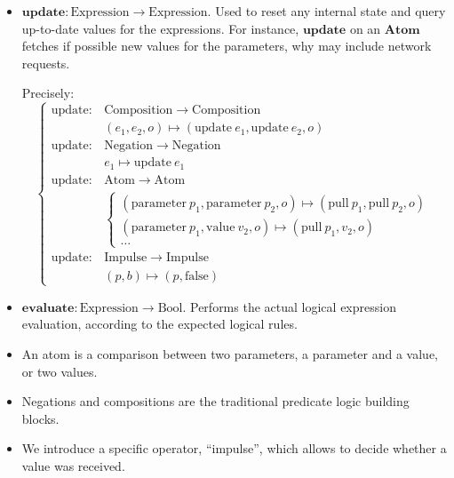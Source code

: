 \documentclass[applsci,article,submit,moreauthors,pdftex,10pt,a4paper]{mdpi}
\begin{document}
\begin{itemize}
    \item $\mathbf{update}: \mathrm{Expression} \rightarrow \mathrm{Expression}$. Used to reset any internal state and query up-to-date values for the expressions. For instance, $\mathbf{update}$ on an $\mathbf{Atom}$ fetches if possible new values for the parameters, why may include network requests.
    
    Precisely:
    \[
    \begin{cases}
    \mathrm{update} : & \mathrm{Composition} \rightarrow \mathrm{Composition} \\ 
    & (e_1, e_2, o) \mapsto (\mathrm{update}~e_1, \mathrm{update}~e_2, o) \\
    \mathrm{update} : & \mathrm{Negation} \rightarrow \mathrm{Negation} \\
    &  e_1 \mapsto \mathrm{update}~ e_1 \\
    \mathrm{update} :&  \mathrm{Atom} \rightarrow \mathrm{Atom} \\
    & \begin{cases}
    (\mathrm{parameter}~p_1, \mathrm{parameter}~p_2, o) \mapsto (\mathrm{pull}~p_1, \mathrm{pull}~p_2, o) \\
    (\mathrm{parameter}~p_1, \mathrm{value}~v_2, o) \mapsto (\mathrm{pull}~p_1, v_2, o) \\ 
    \dots
    \end{cases}\\
    \mathrm{update} : & \mathrm{Impulse} \rightarrow \mathrm{Impulse} \\
    & (p, b) \mapsto (p, \mathrm{false})
    \end{cases}
    \] 
    
    
    
    \item $\mathbf{evaluate}: \mathrm{Expression} \rightarrow \mathrm{Bool}$. Performs the actual logical expression evaluation, according to the expected logical rules. %
\end{itemize}

\begin{itemize}
    \item An atom is a comparison between two parameters, a parameter and a value, or two values.
    \item Negations and compositions are the traditional predicate logic building blocks.
    \item We introduce a specific operator, ``impulse'', which allows to decide whether a value was received.
\end{itemize}
\end{document}
